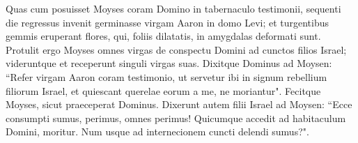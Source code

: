 \begin{biblechapter}
\verse Quas cum posuisset Moyses coram Domino in tabernaculo testimonii, 
\verse sequenti die regressus invenit germinasse virgam Aaron in domo Levi; et turgentibus gemmis eruperant flores, qui, foliis dilatatis, in amygdalas deformati sunt. 
\verse Protulit ergo Moyses omnes virgas de conspectu Domini ad cunctos filios Israel; videruntque et receperunt singuli virgas suas. 
\verse Dixitque Dominus ad Moysen: “Refer virgam Aaron coram testimonio, ut servetur ibi in signum rebellium filiorum Israel, et quiescant querelae eorum a me, ne moriantur". 
\verse Fecitque Moyses, sicut praeceperat Dominus. 
\verse Dixerunt autem filii Israel ad Moysen: “Ecce consumpti sumus, perimus, omnes perimus! 
\verse Quicumque accedit ad habitaculum Domini, moritur. Num usque ad internecionem cuncti delendi sumus?". 
\end{biblechapter}


